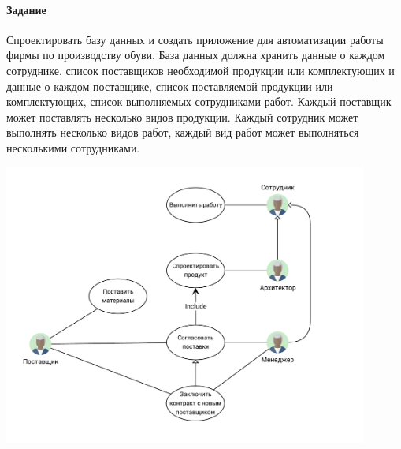 \paragraph{Задание}

Спроектировать базу данных и создать приложение для автоматизации работы фирмы по производству обуви.
База данных должна хранить данные о каждом сотруднике, список поставщиков необходимой продукции или комплектующих и данные о каждом поставщике, список поставляемой продукции или комплектующих, список выполняемых сотрудниками работ.
Каждый поставщик может поставлять несколько видов продукции.
Каждый сотрудник может выполнять несколько видов работ, каждый вид работ может выполняться несколькими сотрудниками.

\includegraphics[width=0.9\textwidth]{social-network.pdf}

